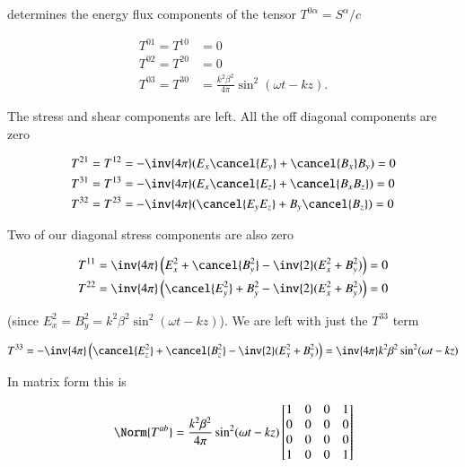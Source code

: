 determines the energy flux components of the tensor $T^{0 \alpha} = S^\alpha/c$

\begin{align}\label{eqn:relativisticElectrodynamicsPS6P1:480}
T^{0 1} = T^{1 0} &= 0 \\
T^{0 2} = T^{2 0} &= 0 \\
T^{0 3} = T^{3 0} &= \frac{k^2 \beta^2}{4 \pi} \sin^2(\omega t - k z).
\end{align}

The stress and shear components are left.  All the off diagonal components are zero

\begin{align}\label{eqn:relativisticElectrodynamicsPS6P1:500}
T^{2 1} = T^{1 2} &= - \inv{4 \pi} ( E_x \cancel{E_y} + \cancel{B_x} B_y ) = 0 \\
T^{3 1} = T^{1 3} &= - \inv{4 \pi} ( E_x \cancel{E_z} + \cancel{B_x B_z} ) = 0 \\
T^{3 2} = T^{2 3} &= - \inv{4 \pi} ( \cancel{E_y E_z} + B_y \cancel{B_z} ) = 0
\end{align}

Two of our diagonal stress components are also zero

\begin{align}\label{eqn:relativisticElectrodynamicsPS6P1:520}
T^{1 1} &= \inv{4 \pi} \left( E_x^2 + \cancel{B_y^2} - \inv{2} (E_x^2 + B_y^2) \right) = 0 \\
T^{2 2} &= \inv{4 \pi} \left( \cancel{E_y^2} + B_y^2 - \inv{2} (E_x^2 + B_y^2) \right) = 0
\end{align}

(since $E_x^2 = B_y^2 = k^2 \beta^2 \sin^2(\omega t - k z)$).  We are left with just the $T^{3 3}$ term

\begin{equation}\label{eqn:relativisticElectrodynamicsPS6P1:540}
T^{3 3} = -\inv{4 \pi} \left( \cancel{E_z^2} + \cancel{B_z^2} - \inv{2}(E_x^2 + B_y^2) \right) = \inv{4 \pi} k^2 \beta^2 \sin^2(\omega t - k z)
\end{equation}

In matrix form this is

\begin{equation}\label{eqn:relativisticElectrodynamicsPS6P1:560}
\Norm{T^{a b}} = 
\frac{k^2 \beta^2}{4 \pi} \sin^2(\omega t - k z)
\begin{bmatrix}
1 & 0 & 0 & 1 \\
0 & 0 & 0 & 0 \\
0 & 0 & 0 & 0 \\
1 & 0 & 0 & 1 \\
\end{bmatrix}
\end{equation}

